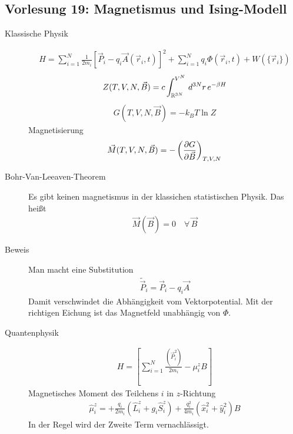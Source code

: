 \subsection*{Vorlesung 19: Magnetismus und Ising-Modell}
\begin{description}
  \item[Klassische Physik] 
    \begin{align*}
      H = \sum_{i=1}^{N}\frac{1}{2 m_i} \left[ \vec{P}_i - q_i \vec{A}(\vec{r}_i, t) \right]^2
      + \sum_{i=1}^{N} q_i \Phi(\vec{r}_i, t) + W (\{\vec{r}_i\})
    \end{align*}
    \begin{align*}
      Z(T, V, N, \vec{B}) = c \int_{\mathbb{R}^{3N}}^{V^N} \,d^{3N} r\, e^{-\beta H}
    \end{align*}
    \begin{align*}
      G(T, V, N, \vec{B}) = - k_B T \ln{Z}
    \end{align*}
    Magnetisierung
    \begin{align*}
      \vec{M}(T, V, N, \vec{B}) = - \left( \frac{\partial G }{\partial \vec{B}} \right)_{T, V, N}
    \end{align*}
  \item[Bohr-Van-Leeaven-Theorem]
    Es gibt keinen magnetismus in der klassichen statistischen Physik. Das heißt
    \begin{align*}
      \vec{M}(\vec{B}) = 0 \quad\forall\, \vec{B}
    \end{align*}
  \item[Beweis] Man macht eine Substitution
    \begin{align*}
      \tilde{\vec{P}}_i = \vec{P}_i - q_i \vec{A}
    \end{align*}
    Damit verschwindet die Abhängigkeit vom Vektorpotential. Mit der richtigen
    Eichung ist das Magnetfeld unabhängig von $\Phi$.
  \item[Quantenphysik]
    \begin{align*}
      H = [\sum_{i=1}^{N} 
        \frac{( \vec{P}_i^2 )}{2 m_i} - \mu_i^z B
    ]    
  \end{align*}
    Magnetisches Moment des Teilchens $i$ in $z$-Richtung
    \begin{align*}
      \hat{\mu}_i^z = + \frac{q_i}{2 m_i}\left( \hat{L}_i^z + g_i \hat{S}_i^z \right)
      + \frac{q_i^2}{4 m_i} (\hat{x}_i^2 + \hat{y}_i^2) B
    \end{align*}
    In der Regel wird der Zweite Term vernachlässigt.

\end{description}
